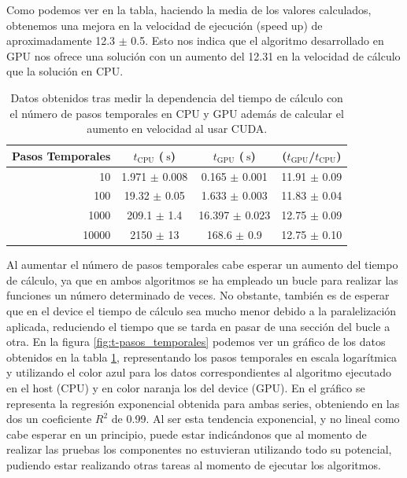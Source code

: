 \documentclass[11pt,a4paper,twoside,pdf]{article}
\numberwithin{equation}{section}
\begin{document}
Como podemos ver en la tabla, haciendo la media de los valores calculados, obtenemos una mejora en la velocidad de ejecución (speed up) de aproximadamente 12.3 $\pm$ 0.5. Esto nos indica que el algoritmo desarrollado en GPU nos ofrece una solución con un aumento del 12.31 en la velocidad de cálculo que la solución en CPU.

\begin{table}[h]
    \centering
    \begin{tabular}{|r|c|c|c|}
    \hline
    Pasos Temporales &  $t_\text{CPU}$ ($\SI{}{\second}$)  & $t_\text{GPU}$ ($\SI{}{\second}$) &  ($t_\text{GPU}$/$t_\text{CPU}$)  \\ \hline \hline
     10 & 1.971 $\pm$ 0.008 & 0.165 $\pm$ 0.001 & 11.91 $\pm$ 0.09\\ \hline
     100 & 19.32 $\pm$ 0.05 & 1.633 $\pm$ 0.003 & 11.83 $\pm$ 0.04\\ \hline
     1000 & 209.1 $\pm$ 1.4 & 16.397 $\pm$ 0.023 & 12.75 $\pm$ 0.09\\ \hline
     10000 & 2150 $\pm$ 13 & 168.6 $\pm$ 0.9 & 12.75 $\pm$ 0.10\\ \hline
    \end{tabular}
    \caption{Datos obtenidos tras medir la dependencia del tiempo de cálculo con el número de pasos temporales en CPU y GPU además de calcular el aumento en velocidad al usar CUDA.}
    \label{tab:npasos}
\end{table}


Al aumentar el número de pasos temporales cabe esperar un aumento del tiempo de cálculo, ya que en ambos algoritmos se ha empleado un bucle para realizar las funciones un número determinado de veces. No obstante, también es de esperar que en el device el tiempo de cálculo sea mucho menor debido a la paralelización aplicada, reduciendo el tiempo que se tarda en pasar de una sección del bucle a otra. En la figura \ref{fig:t-pasos_temporales} podemos ver un gráfico de los datos obtenidos en la tabla \ref{tab:npasos}, representando los pasos temporales en escala logarítmica y utilizando el color azul para los datos correspondientes al algoritmo ejecutado en el host (CPU) y en color naranja los del device (GPU). En el gráfico se representa la regresión exponencial obtenida para ambas series, obteniendo en las dos un coeficiente $R^2$ de 0.99. Al ser esta tendencia exponencial, y no lineal como cabe esperar en un principio, puede estar indicándonos que al momento de realizar las pruebas los componentes no estuvieran utilizando todo su potencial, pudiendo estar realizando otras tareas al momento de ejecutar los algoritmos.
\end{document}
